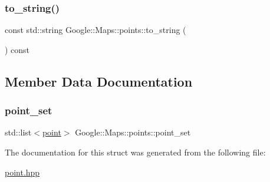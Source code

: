 \mbox{\label{a00063_a3e732652c10f7b3e6797ef4ecd7092f4}} 
\subsubsection{\texorpdfstring{to\+\_\+string()}{to\_string()}}
{\footnotesize\ttfamily const std\+::string Google\+::\+Maps\+::points\+::to\+\_\+string (\begin{DoxyParamCaption}{ }\end{DoxyParamCaption}) const\hspace{0.3cm}{\ttfamily [inline]}}



\subsection{Member Data Documentation}
\mbox{\label{a00063_affe83c1e22c96884077b33b98a3e7667}} 
\subsubsection{\texorpdfstring{point\+\_\+set}{point\_set}}
{\footnotesize\ttfamily std\+::list$<$\hyperlink{a00059}{point}$>$ Google\+::\+Maps\+::points\+::point\+\_\+set\hspace{0.3cm}{\ttfamily [private]}}



The documentation for this struct was generated from the following file\+:\begin{DoxyCompactItemize}
\item 
\hyperlink{a00029}{point.\+hpp}\end{DoxyCompactItemize}
